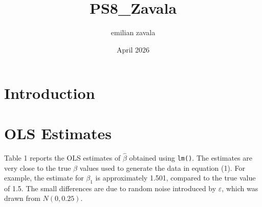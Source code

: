 \documentclass{article}
\title{PS8\_Zavala}
\author{emilian zavala}
\date{April 2026}
\begin{document}
\maketitle

\section{Introduction}

\section{OLS Estimates}

Table 1 reports the OLS estimates of $\hat{\beta}$ obtained using \texttt{lm()}. The estimates are very close to the true $\beta$ values used to generate the data in equation (1). For example, the estimate for $\beta_1$ is approximately 1.501, compared to the true value of 1.5. The small differences are due to random noise introduced by $\varepsilon$, which was drawn from $N(0, 0.25)$.
\end{document}
